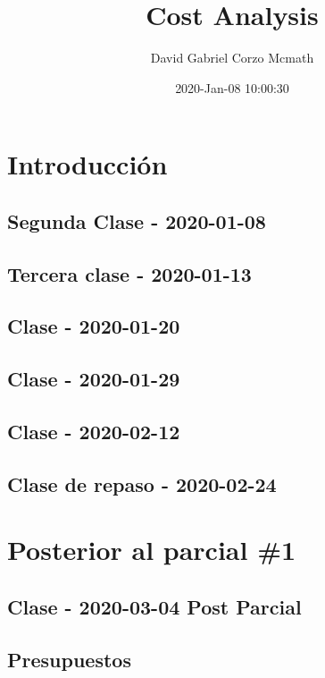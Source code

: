 \documentclass[openany]{book}
\title{Cost Analysis}
\author{David Gabriel Corzo Mcmath}
\date{2020-Jan-08 10:00:30}
\begin{document}
\maketitle
\tableofcontents

\part{Introducción} 
\chapter{Segunda Clase - 2020-01-08}


\chapter{Tercera clase - 2020-01-13}


\chapter{Clase - 2020-01-20}


\chapter{Clase - 2020-01-29}


\chapter{Clase - 2020-02-12}


\chapter{Clase de repaso - 2020-02-24}



\part{Posterior al parcial \#1} 

\chapter{Clase - 2020-03-04 Post Parcial}


\chapter{Presupuestos} %

\end{document}

